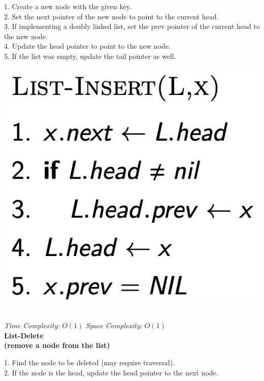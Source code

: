 {\begin{minipage}[t]{0.41\textwidth}
    \begin{minipage}[htp]{0.65\textwidth}
        \scriptsize
        1. Create a new node with the given key.\\
        2. Set the next pointer of the new node to point to the current head.\\
        3. If implementing a doubly linked list, set the prev pointer of the current head to the new node.\\
        4. Update the head pointer to point to the new node.\\
        5. If the list was empty, update the tail pointer as well.
    \end{minipage}
    \begin{minipage}[htp]{0.3\textwidth}
        \begin{center}
            \includegraphics[width=0.9\linewidth]{images/list-insert.png}
        \end{center}
    \end{minipage}\\
    \textit{Time Complexity:} \(O(1)\) \quad \textit{Space Complexity:} \(O(1)\)\\
    \textbf{\scriptsize List-Delete \\(remove a node from the list)}\\
    \begin{minipage}[htp]{0.65\textwidth}
        \scriptsize
        1. Find the node to be deleted (may require traversal).\\
        2. If the node is the head, update the head pointer to the next node.\\

\end{minipage}
\end{minipage}}
